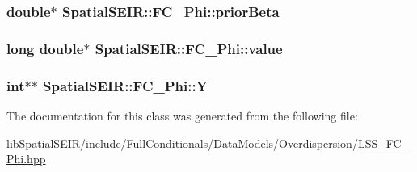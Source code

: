 \hypertarget{classSpatialSEIR_1_1FC__Phi_ad65cf8a1b9bc7fc76e63bfe6d051dda6}{
\subsubsection[{prior\-Beta}]{\setlength{\rightskip}{0pt plus 5cm}double$\ast$ Spatial\-S\-E\-I\-R\-::\-F\-C\-\_\-\-Phi\-::prior\-Beta}}\label{classSpatialSEIR_1_1FC__Phi_ad65cf8a1b9bc7fc76e63bfe6d051dda6}
\hypertarget{classSpatialSEIR_1_1FC__Phi_a649b11fba5f8820f83ced5a538f40fa3}{
\subsubsection[{value}]{\setlength{\rightskip}{0pt plus 5cm}long double$\ast$ Spatial\-S\-E\-I\-R\-::\-F\-C\-\_\-\-Phi\-::value}}\label{classSpatialSEIR_1_1FC__Phi_a649b11fba5f8820f83ced5a538f40fa3}
\hypertarget{classSpatialSEIR_1_1FC__Phi_a74748c40d5729ec9bdacbc04f2294548}{
\subsubsection[{Y}]{\setlength{\rightskip}{0pt plus 5cm}int$\ast$$\ast$ Spatial\-S\-E\-I\-R\-::\-F\-C\-\_\-\-Phi\-::\-Y}}\label{classSpatialSEIR_1_1FC__Phi_a74748c40d5729ec9bdacbc04f2294548}


The documentation for this class was generated from the following file\-:\begin{DoxyCompactItemize}
\item 
lib\-Spatial\-S\-E\-I\-R/include/\-Full\-Conditionals/\-Data\-Models/\-Overdispersion/\hyperlink{LSS__FC__Phi_8hpp}{L\-S\-S\-\_\-\-F\-C\-\_\-\-Phi.\-hpp}\end{DoxyCompactItemize}
